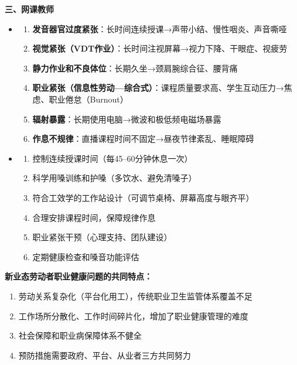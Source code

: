 \begin{keybox}
\textbf{三、网课教师}
\begin{itemize}[leftmargin=*]
    \item {}
    \begin{enumerate}[leftmargin=*]
        \item \textbf{发音器官过度紧张}：长时间连续授课→声带小结、慢性咽炎、声音嘶哑
        \item \textbf{视觉紧张（VDT作业）}：长时间注视屏幕→视力下降、干眼症、视疲劳
        \item \textbf{静力作业和不良体位}：长期久坐→颈肩腕综合征、腰背痛
        \item \textbf{职业紧张（信息性劳动—综合式）}：课程质量要求高、学生互动压力→焦虑、职业倦怠（Burnout）
        \item \textbf{辐射暴露}：长期使用电脑→微波和极低频电磁场暴露
        \item \textbf{作息不规律}：直播课程时间不固定→昼夜节律紊乱、睡眠障碍
    \end{enumerate}
    \item {}
    \begin{enumerate}[leftmargin=*]
        \item 控制连续授课时间（每45--60分钟休息一次）
        \item 科学用嗓训练和护嗓（多饮水、避免清嗓子）
        \item 符合工效学的工作站设计（可调节桌椅、屏幕高度与眼齐平）
        \item 合理安排课程时间，保障规律作息
        \item 职业紧张干预（心理支持、团队建设）
        \item 定期健康检查和嗓音功能评估
    \end{enumerate}
\end{itemize}

\begin{exambox}
\textbf{新业态劳动者职业健康问题的共同特点：}
\begin{enumerate}[leftmargin=*]
    \item 劳动关系复杂化（平台化用工），传统职业卫生监管体系覆盖不足
    \item 工作场所分散化、工作时间碎片化，增加了职业健康管理的难度
    \item 社会保障和职业病保障体系不健全
    \item 预防措施需要政府、平台、从业者三方共同努力
\end{enumerate}
\end{exambox}
\end{keybox}

